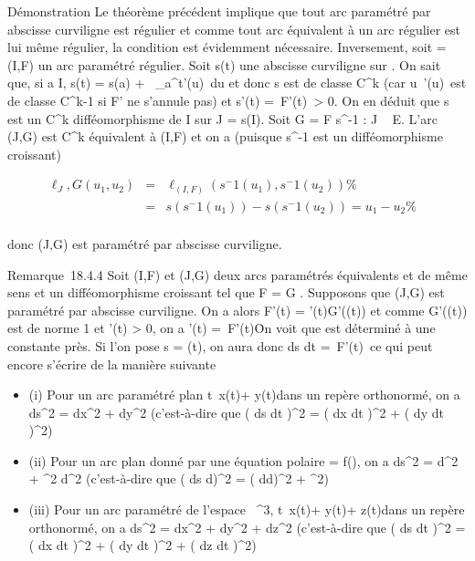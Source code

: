 \documentclass[]{article}
\begin{document}
Démonstration Le théorème précédent implique que tout arc paramétré par
abscisse curviligne est régulier et comme tout arc équivalent à un arc
régulier est lui même régulier, la condition est évidemment nécessaire.
Inversement, soit \Gamma = (I,F) un arc paramétré régulier. Soit s(t) une
abscisse curviligne sur \Gamma. On sait que, si a \in I, s(t) = s(a)
+\int ~
_a^t\F'(u)\
du et donc s est de classe C^k (car
u\mapsto~\F'(u)\
est de classe C^k-1 si F' ne s'annule pas) et s'(t)
=\ F'(t)\
\textgreater{} 0. On en déduit que s est un C^k
difféomorphisme de I sur J = s(I). Soit G = F \cdot s^-1 : J \rightarrow~ E.
L'arc (J,G) est C^k équivalent à (I,F) et on a (puisque
s^-1 est un difféomorphisme croissant)

\begin{align*}
\ell_J,G(u_1,u_2)& =&
\ell_(I,F)(s^-1(u_
1),s^-1(u_ 2)) \%&
\\ & =& s(s^-1(u_
1)) - s(s^-1(u_ 2)) = u_1 -
u_2\%& \\
\end{align*}

donc (J,G) est paramétré par abscisse curviligne.

Remarque~18.4.4 Soit (I,F) et (J,G) deux arcs paramétrés équivalents et
de même sens et \theta un difféomorphisme croissant tel que F = G \cdot \theta.
Supposons que (J,G) est paramétré par abscisse curviligne. On a alors
F'(t) = \theta'(t)G'(\theta(t)) et comme G'(\theta(t)) est de norme 1 et \theta'(t)
\textgreater{} 0, on a \theta'(t) =\
F'(t)\. On voit que \theta est déterminé à une
constante près. Si l'on pose s = \theta(t), on aura donc  ds
\over dt =\
F'(t)\ ce qui peut encore s'écrire de la
manière suivante

\begin{itemize}
\itemsep1pt\parskip0pt
\item
  (i) Pour un arc paramétré plan
  t\mapsto~x(t)\vec\imath +
  y(t)\vecȷ dans un repère orthonormé, on a
  ds^2 = dx^2 + dy^2 (c'est-à-dire que
  \left ( ds \over dt
  \right )^2 = \left ( dx
  \over dt \right )^2 +
  \left ( dy \over dt
  \right )^2)
\item
  (ii) Pour un arc plan donné par une équation polaire \rho = f(\theta), on a
  ds^2 = d\rho^2 + \rho^2 d\theta^2
  (c'est-à-dire que \left ( ds \over
  d\theta \right )^2 = \left (
  d\rho \over d\theta \right )^2 +
  \rho^2)
\item
  (iii) Pour un arc paramétré de l'espace ~^3,
  t\mapsto~x(t)\vec\imath +
  y(t)\vecȷ + z(t)\veck dans un
  repère orthonormé, on a ds^2 = dx^2 +
  dy^2 + dz^2 (c'est-à-dire que
  \left ( ds \over dt
  \right )^2 = \left ( dx
  \over dt \right )^2 +
  \left ( dy \over dt
  \right )^2 + \left ( dz
  \over dt \right )^2)
\end{itemize}
\end{document}
